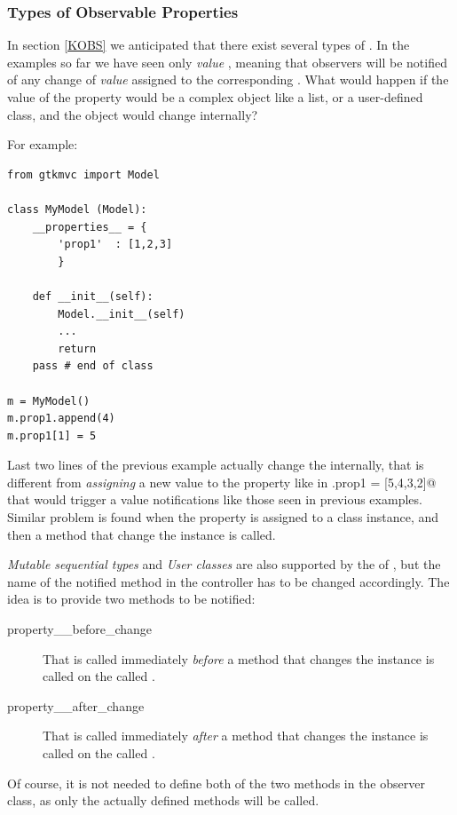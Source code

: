 \subsubsection{\label{KOBS:DET}Types of Observable Properties}

In section \ref{KOBS} we anticipated that there exist several types
of \OP. In the examples so far we have seen only \emph{value} \OPS,
meaning that observers will be notified of any change of \emph{value}
assigned to the corresponding \OP. What would happen if the value of
the property would be a complex object like a list, or a user-defined
class, and the object would change internally?

For example:

{ \codesize 
\begin{verbatim} 
from gtkmvc import Model

class MyModel (Model):
    __properties__ = {
        'prop1'  : [1,2,3]
        }

    def __init__(self):
        Model.__init__(self)
        ...
        return
    pass # end of class

m = MyModel()
m.prop1.append(4)
m.prop1[1] = 5
\end{verbatim}
}

Last two lines of the previous example actually change the \OP
internally, that is different from \emph{assigning} a new value to the
property like in \verb@m.prop1 = [5,4,3,2]@ that would trigger a value
notifications like those seen in previous examples.  Similar problem
is found when the property is assigned to a class instance, and then a
method that change the instance is called.

\emph{Mutable sequential types} and \emph{User classes} are also
supported by the \obs of \pygtkmvc, but the name of the notified
method in the controller has to be changed accordingly.
The idea is to provide two methods to be notified:
\begin{description}
\item[property\_\_before\_change] That is called
  immediately \emph{before} a method that changes the instance is
  called on the \OP called .
\item[property\_\_after\_change] That is called
  immediately \emph{after} a method that changes the instance is
  called on the \OP called .
\end{description}

Of course, it is not needed to define both of the two methods in the
observer class, as only the actually defined methods will be called. 

